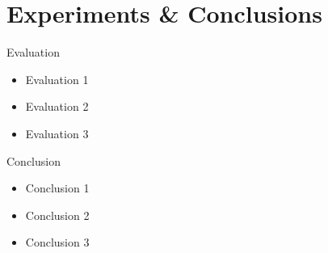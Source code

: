 \section{Experiments \& Conclusions}

\begin{frame}{Evaluation}

    \begin{itemize}
		\item Evaluation 1
		\item Evaluation 2
        \item Evaluation 3
    \end{itemize}
\end{frame}

\begin{frame}{Conclusion}
    \begin{itemize}
        \item Conclusion 1
		\item Conclusion 2
		\item Conclusion 3
	\end{itemize}
\end{frame}